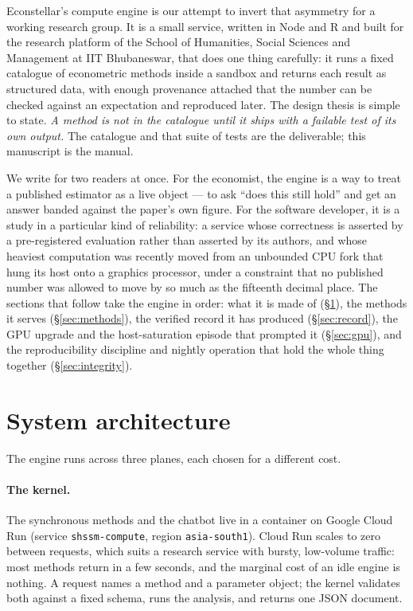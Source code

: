 \documentclass[11pt]{article}
\newcommand{\code}[1]{\texttt{\small #1}}
\begin{document}
Econstellar's compute engine is our attempt to invert that asymmetry for a
working research group. It is a small service, written in Node and R and built
for the research platform of the School of Humanities, Social Sciences and
Management at IIT Bhubaneswar, that does one thing carefully: it runs a fixed
catalogue of econometric methods inside a sandbox and returns each result as
structured data, with enough provenance attached that the number can be checked
against an expectation and reproduced later. The design thesis is simple to
state. \emph{A method is not in the catalogue until it ships with a failable
test of its own output.} The catalogue and that suite of tests are the
deliverable; this manuscript is the manual.

We write for two readers at once. For the economist, the engine is a way to
treat a published estimator as a live object --- to ask ``does this still hold''
and get an answer banded against the paper's own figure. For the software
developer, it is a study in a particular kind of reliability: a service whose
correctness is asserted by a pre-registered evaluation rather than asserted by
its authors, and whose heaviest computation was recently moved from an unbounded
CPU fork that hung its host onto a graphics processor, under a constraint that no
published number was allowed to move by so much as the fifteenth decimal place.
The sections that follow take the engine in order: what it is made of
(\S\ref{sec:arch}), the methods it serves (\S\ref{sec:methods}), the verified
record it has produced (\S\ref{sec:record}), the GPU upgrade and the host-saturation
episode that prompted it (\S\ref{sec:gpu}), and the reproducibility discipline and
nightly operation that hold the whole thing together (\S\ref{sec:integrity}).

\section{System architecture}
\label{sec:arch}
The engine runs across three planes, each chosen for a different cost.

\paragraph{The kernel.} The synchronous methods and the chatbot live in a
container on Google Cloud Run (service \code{shssm-compute}, region
\code{asia-south1}). Cloud Run scales to zero between requests, which suits a
research service with bursty, low-volume traffic: most methods return in a few
seconds, and the marginal cost of an idle engine is nothing. A request names a
method and a parameter object; the kernel validates both against a fixed
schema, runs the analysis, and returns one JSON document.
\end{document}

